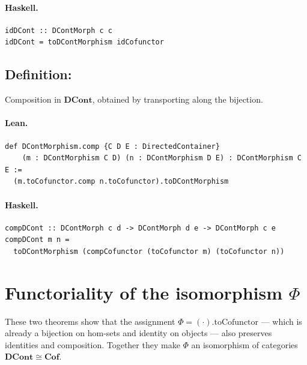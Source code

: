 \documentclass[11pt,a4paper]{article}
\begin{document}
\paragraph{Haskell.}
\begin{lstlisting}[style=haskell]
idDCont :: DContMorph c c
idDCont = toDContMorphism idCofunctor
\end{lstlisting}


\subsection{Definition: }

\begin{defn}
Composition in $\mathbf{DCont}$, obtained by transporting
 along the bijection.
\end{defn}

\paragraph{Lean.}
\begin{lstlisting}[style=lean]
def DContMorphism.comp {C D E : DirectedContainer}
    (m : DContMorphism C D) (n : DContMorphism D E) : DContMorphism C E :=
  (m.toCofunctor.comp n.toCofunctor).toDContMorphism
\end{lstlisting}

\paragraph{Haskell.}
\begin{lstlisting}[style=haskell]
compDCont :: DContMorph c d -> DContMorph d e -> DContMorph c e
compDCont m n =
  toDContMorphism (compCofunctor (toCofunctor m) (toCofunctor n))
\end{lstlisting}


\section{Functoriality of the isomorphism $\Phi$}

These two theorems show that the assignment $\Phi = ({\cdot}).\mathrm{toCofunctor}$
--- which is already a bijection on hom-sets and identity on objects --- also
preserves identities and composition.  Together they make $\Phi$ an isomorphism
of categories $\mathbf{DCont} \cong \mathbf{Cof}$.
\end{document}
